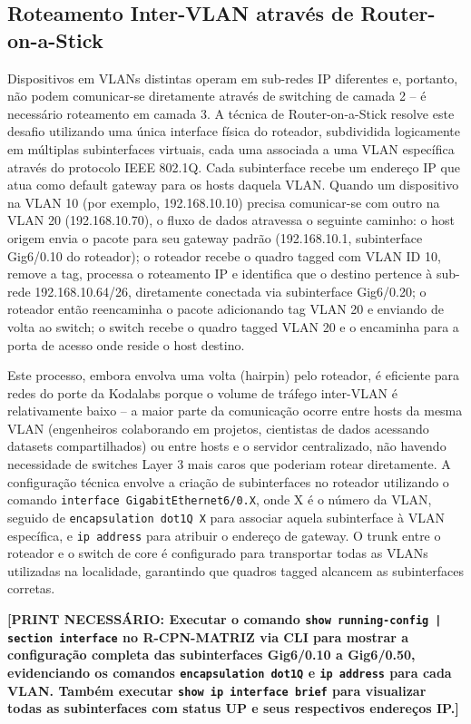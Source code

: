 \documentclass[12pt,a4paper]{article}
\begin{document}
\subsection{Roteamento Inter-VLAN através de Router-on-a-Stick}

Dispositivos em VLANs distintas operam em sub-redes IP diferentes e, portanto, não podem comunicar-se diretamente através de switching de camada 2 -- é necessário roteamento em camada 3. A técnica de Router-on-a-Stick resolve este desafio utilizando uma única interface física do roteador, subdividida logicamente em múltiplas subinterfaces virtuais, cada uma associada a uma VLAN específica através do protocolo IEEE 802.1Q. Cada subinterface recebe um endereço IP que atua como default gateway para os hosts daquela VLAN. Quando um dispositivo na VLAN 10 (por exemplo, 192.168.10.10) precisa comunicar-se com outro na VLAN 20 (192.168.10.70), o fluxo de dados atravessa o seguinte caminho: o host origem envia o pacote para seu gateway padrão (192.168.10.1, subinterface Gig6/0.10 do roteador); o roteador recebe o quadro tagged com VLAN ID 10, remove a tag, processa o roteamento IP e identifica que o destino pertence à sub-rede 192.168.10.64/26, diretamente conectada via subinterface Gig6/0.20; o roteador então reencaminha o pacote adicionando tag VLAN 20 e enviando de volta ao switch; o switch recebe o quadro tagged VLAN 20 e o encaminha para a porta de acesso onde reside o host destino.

Este processo, embora envolva uma volta (hairpin) pelo roteador, é eficiente para redes do porte da Kodalabs porque o volume de tráfego inter-VLAN é relativamente baixo -- a maior parte da comunicação ocorre entre hosts da mesma VLAN (engenheiros colaborando em projetos, cientistas de dados acessando datasets compartilhados) ou entre hosts e o servidor centralizado, não havendo necessidade de switches Layer 3 mais caros que poderiam rotear diretamente. A configuração técnica envolve a criação de subinterfaces no roteador utilizando o comando \texttt{interface GigabitEthernet6/0.X}, onde X é o número da VLAN, seguido de \texttt{encapsulation dot1Q X} para associar aquela subinterface à VLAN específica, e \texttt{ip address} para atribuir o endereço de gateway. O trunk entre o roteador e o switch de core é configurado para transportar todas as VLANs utilizadas na localidade, garantindo que quadros tagged alcancem as subinterfaces corretas.

\textbf{[PRINT NECESSÁRIO: Executar o comando \texttt{show running-config | section interface} no R-CPN-MATRIZ via CLI para mostrar a configuração completa das subinterfaces Gig6/0.10 a Gig6/0.50, evidenciando os comandos \texttt{encapsulation dot1Q} e \texttt{ip address} para cada VLAN. Também executar \texttt{show ip interface brief} para visualizar todas as subinterfaces com status UP e seus respectivos endereços IP.]}
\end{document}
